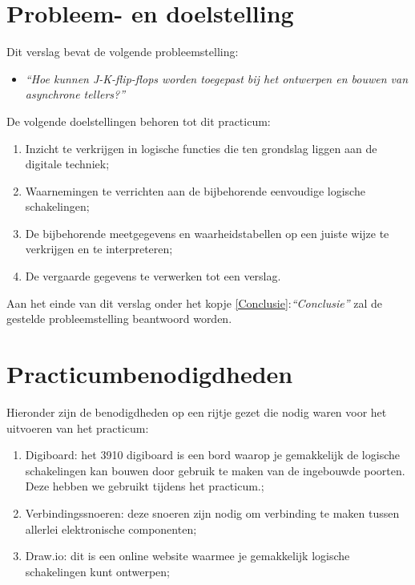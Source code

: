 \documentclass[12pt]{article}
\begin{document}
\section{Probleem- en doelstelling}
\label{Problem}
Dit verslag bevat de volgende probleemstelling:
\begin{itemize}
    \item \textit{``Hoe kunnen J-K-flip-flops worden toegepast bij het ontwerpen en bouwen van asynchrone tellers?''}
\end{itemize}
\vspace{0,5cm}
De volgende doelstellingen behoren tot dit practicum:
\begin{enumerate}
    \item Inzicht te verkrijgen in logische functies die ten grondslag liggen aan de digitale techniek;
    \item Waarnemingen te verrichten aan de bijbehorende eenvoudige logische schakelingen;
    \item De bijbehorende meetgegevens en waarheidstabellen op een juiste wijze te verkrijgen en te interpreteren;
    \item De vergaarde gegevens te verwerken tot een verslag.
\end{enumerate}

\vspace{0,5cm}
Aan het einde van dit verslag onder het kopje \ref{Conclusie}:\textit{``Conclusie''} zal de gestelde probleemstelling beantwoord worden.
\pagebreak

\section{Practicumbenodigdheden}
\label{practicumbenodigdheden}
Hieronder zijn de benodigdheden op een rijtje gezet die nodig waren voor het uitvoeren van het practicum:
\begin{enumerate}
    \item Digiboard: het 3910 digiboard is een bord waarop je gemakkelijk de logische schakelingen kan bouwen door gebruik te maken van de ingebouwde poorten. Deze hebben we gebruikt tijdens het practicum.\cite{hps-systemtechnik_ds_DIGI};
    \item Verbindingssnoeren: deze snoeren zijn nodig om verbinding te maken tussen allerlei elektronische componenten; 
    \item Draw.io: dit is een online website waarmee je gemakkelijk logische schakelingen kunt ontwerpen;
\end{enumerate}
\pagebreak
\end{document}
